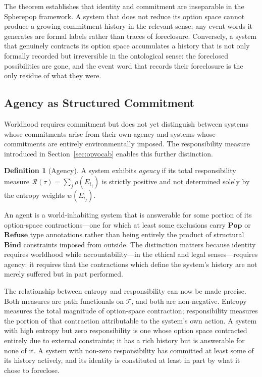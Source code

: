 \documentclass[12pt]{article}
\theoremstyle{plain}
\theoremstyle{definition}
\newtheorem{definition}[theorem]{Definition}
\theoremstyle{remark}
\begin{document}
The theorem establishes that identity and commitment are inseparable in the
Spherepop framework.  A system that does not reduce its option space cannot
produce a growing commitment history in the relevant sense; any event words it
generates are formal labels rather than traces of foreclosure.  Conversely,
a system that genuinely contracts its option space accumulates a history that
is not only formally recorded but irreversible in the ontological sense: the
foreclosed possibilities are gone, and the event word that records their
foreclosure is the only residue of what they were.

\subsection{Agency as Structured Commitment}

Worldhood requires commitment but does not yet distinguish between systems
whose commitments arise from their own agency and systems whose commitments are
entirely environmentally imposed.  The responsibility measure introduced in
Section~\ref{sec:opvocab} enables this further distinction.

\begin{definition}[Agency]
A system exhibits \emph{agency} if its total responsibility measure
$\mathcal{R}(\tau) = \sum_j \rho(E_{i_j})$ is strictly positive and not
determined solely by the entropy weights $w(E_{i_j})$.
\end{definition}

An agent is a world-inhabiting system that is answerable for some portion of
its option-space contractions---one for which at least some exclusions carry
$\mathbf{Pop}$ or $\mathbf{Refuse}$ type annotations rather than being entirely
the product of structural $\mathbf{Bind}$ constraints imposed from outside.
The distinction matters because identity requires worldhood while
accountability---in the ethical and legal senses---requires agency: it requires
that the contractions which define the system's history are not merely suffered
but in part performed.

The relationship between entropy and responsibility can now be made precise.
Both measures are path functionals on $\mathcal{T}$, and both are non-negative.
Entropy measures the total magnitude of option-space contraction; responsibility
measures the portion of that contraction attributable to the system's own action.
A system with high entropy but zero responsibility is one whose option space
contracted entirely due to external constraints; it has a rich history but is
answerable for none of it.  A system with non-zero responsibility has committed
at least some of its history actively, and its identity is constituted at least
in part by what it chose to foreclose.
\end{document}
